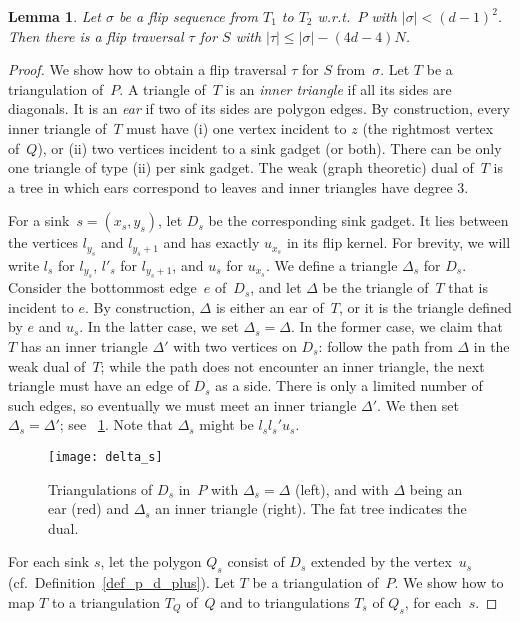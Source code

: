 \documentclass[a4paper,11pt]{article}
\newtheorem{lemma}[theorem]{Lemma}
\begin{document}
\begin{lemma}\label{lem:flip_traversal}
Let $\sigma$ be a flip sequence from $T_1$ to $T_2$ w.r.t.~$P$ 
with $|\sigma| < (d-1)^2$.
Then there is a flip traversal $\tau$ for $S$ 
with $|\tau| \leq |\sigma|-(4d-4)N$.
\end{lemma}
\begin{proof}
We show how to obtain a flip traversal $\tau$ for
$S$ from~$\sigma$.
Let $T$ be a triangulation of~$P$.
A triangle of~$T$ is an \emph{inner triangle} if all its sides are 
diagonals. 
It is an \emph{ear} if two of its sides are polygon edges.
By construction, every inner triangle of~$T$ must have
(i) one vertex incident to $z$ (the rightmost vertex of~$Q$), 
or (ii) two vertices incident to a sink gadget (or both).
There can be only one triangle of type (ii) per sink gadget.
The weak (graph theoretic) dual of~$T$ is a tree 
in which ears correspond to leaves and inner triangles have degree $3$.

For a sink~$s = (x_s,y_s)$, let $D_s$ be the corresponding sink gadget.
It lies between the vertices $l_{y_s}$ and $l_{y_s + 1}$ and has exactly $u_{x_s}$ in its flip kernel.
For brevity, we will write $l_s$ for $l_{y_s}$, $l'_{s}$ for $l_{y_s+1}$, and $u_s$ for $u_{x_s}$.
We define a triangle $\Delta_s$  for $D_s$.
Consider the bottommost edge~$e$ of~$D_s$, and let $\Delta$ be the triangle of~$T$ that is incident to $e$.
By construction, $\Delta$ is either an ear of~$T$, or it is the triangle defined by $e$ and $u_s$.
In the latter case, we set $\Delta_s = \Delta$.
In the former case, we claim that $T$ has an inner triangle $\Delta'$ with two vertices on $D_s$:
follow the path from $\Delta$ in the weak dual of~$T$;
while the path does not encounter an inner triangle, the next triangle must have an edge of $D_s$ as a side.
There is only a limited number of such edges, so eventually we must meet an inner triangle $\Delta'$.
We then set $\Delta_s = \Delta'$; see \figurename~\ref{fig_delta_s}.
Note that $\Delta_s$ might be $l_s l_s' u_s$.


\begin{figure}
\centering
\texttt{[image: delta\_s]}
\caption{Triangulations of $D_s$ in~$P$ with $\Delta_s = \Delta$ (left),
and with $\Delta$ being an ear (red) and $\Delta_s$ an inner triangle (right).
The fat tree indicates the dual.
}
\label{fig_delta_s}
\end{figure}

For each sink $s$, let the polygon $Q_s$ consist of $D_s$ extended by the vertex~$u_s$ (cf.~Definition~\ref{def_p_d_plus}).
Let $T$ be a triangulation of~$P$.
We show how to map $T$ to a triangulation $T_Q$ of~$Q$ and to triangulations $T_s$ of $Q_s$, for each~$s$.


\end{proof}
\end{document}

